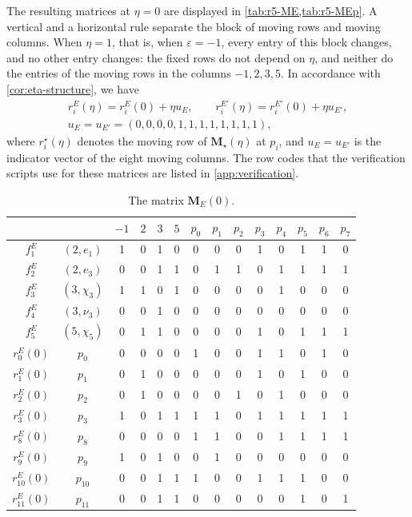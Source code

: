 \documentclass[12pt,oneside,openany]{book}
\theoremstyle{definition}
\theoremstyle{plain}
\numberwithin{equation}{chapter}
\theoremstyle{plain}
\theoremstyle{definition}
\theoremstyle{remark}
\newcommand{\eps}{\varepsilon}
\begin{document}
The resulting matrices at $\eta=0$ are displayed in \cref{tab:r5-ME,tab:r5-MEp}. A vertical and a horizontal rule separate the block of moving rows and moving columns. When $\eta=1$, that is, when $\eps=-1$, every entry of this block changes, and no other entry changes: the fixed rows do not depend on $\eta$, and neither do the entries of the moving rows in the columns $-1,2,3,5$. In accordance with \cref{cor:eta-structure}, we have
\begin{equation}\label{r5:eta}
\begin{gathered}
r^E_i(\eta)=r^E_i(0)+\eta u_E,\qquad r^{E'}_i(\eta)=r^{E'}_i(0)+\eta u_{E'},\\
u_E=u_{E'}=(0,0,0,0,1,1,1,1,1,1,1,1),
\end{gathered}
\end{equation}
where $r^\star_i(\eta)$ denotes the moving row of $\mathbf M_\star(\eta)$ at $p_i$, and $u_E=u_{E'}$ is the indicator vector of the eight moving columns. The row codes that the verification scripts use for these matrices are listed in \cref{app:verification}.

\begin{table}[htbp]
\centering
\caption{The matrix $\mathbf M_E(0)$.}\label{tab:r5-ME}
\begin{tabular}{cc|cccc|cccccccc}
& & $-1$ & $2$ & $3$ & $5$ & $p_0$ & $p_1$ & $p_2$ & $p_3$ & $p_4$ & $p_5$ & $p_6$ & $p_7$\\
\hline
$f^{E}_1$ & $(2,e_1)$ & 1 & 0 & 1 & 0 & 0 & 0 & 0 & 1 & 0 & 1 & 1 & 0 \\
$f^{E}_2$ & $(2,e_3)$ & 0 & 0 & 1 & 1 & 0 & 1 & 1 & 0 & 1 & 1 & 1 & 1 \\
$f^{E}_3$ & $(3,\chi_3)$ & 1 & 1 & 0 & 1 & 0 & 0 & 0 & 0 & 1 & 0 & 0 & 0 \\
$f^{E}_4$ & $(3,\nu_3)$ & 0 & 0 & 1 & 0 & 0 & 0 & 0 & 0 & 0 & 0 & 0 & 0 \\
$f^{E}_5$ & $(5,\chi_5)$ & 0 & 1 & 1 & 0 & 0 & 0 & 0 & 1 & 0 & 1 & 1 & 1 \\
\hline
$r^{E}_0(0)$ & $p_0$ & 0 & 0 & 0 & 0 & 1 & 0 & 0 & 1 & 1 & 0 & 1 & 0 \\
$r^{E}_1(0)$ & $p_1$ & 0 & 1 & 0 & 0 & 0 & 0 & 0 & 1 & 0 & 1 & 0 & 0 \\
$r^{E}_2(0)$ & $p_2$ & 0 & 1 & 0 & 0 & 0 & 0 & 1 & 0 & 1 & 0 & 0 & 0 \\
$r^{E}_3(0)$ & $p_3$ & 1 & 0 & 1 & 1 & 1 & 1 & 0 & 1 & 1 & 1 & 1 & 1 \\
$r^{E}_8(0)$ & $p_8$ & 0 & 0 & 0 & 0 & 1 & 1 & 0 & 0 & 1 & 1 & 1 & 1 \\
$r^{E}_9(0)$ & $p_9$ & 1 & 0 & 1 & 0 & 0 & 1 & 0 & 0 & 0 & 0 & 0 & 0 \\
$r^{E}_{10}(0)$ & $p_{10}$ & 0 & 0 & 1 & 1 & 1 & 0 & 0 & 1 & 1 & 1 & 0 & 0 \\
$r^{E}_{11}(0)$ & $p_{11}$ & 0 & 0 & 1 & 1 & 0 & 0 & 0 & 0 & 0 & 1 & 0 & 1 \\
\end{tabular}
\end{table}
\end{document}

